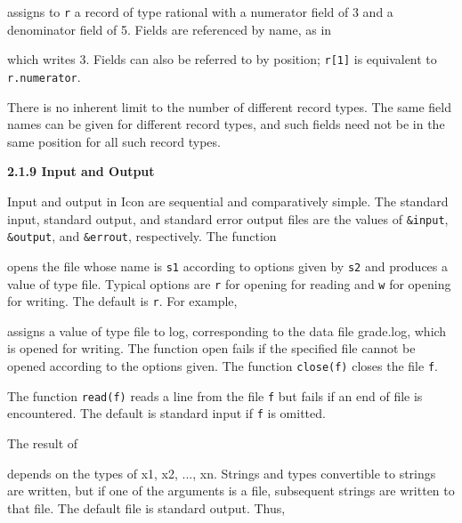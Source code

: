 \noindent
assigns to \texttt{r} a record of type rational with a
numerator field of 3 and a denominator field of 5. Fields are
referenced by name, as in



\noindent which writes 3. Fields can also be referred to by position;
\texttt{r[1]} is equivalent to \texttt{r.numerator}.

There is no inherent limit to the number of different record
types. The same field names can be given for different record types,
and such fields need not be in the same position for all such record
types.

{\sffamily\bfseries
2.1.9 Input and Output}

Input and output in Icon are sequential and comparatively simple. The
standard input, standard output, and standard error output files are
the values of \texttt{\&input}, \texttt{\&output}, and
\texttt{\&errout}, respectively. The function



\noindent opens the file whose name is \texttt{s1} according to
options given by \texttt{s2} and produces a value of type file.
Typical options are \texttt{{\textquotedbl}r{\textquotedbl}} for
opening for reading and \texttt{{\textquotedbl}w{\textquotedbl}} for
opening for writing. The default is
\texttt{{\textquotedbl}r{\textquotedbl}}. For example,



\noindent assigns a value of type file to log, corresponding to the
data file grade.log, which is opened for writing. The function open
fails if the specified file cannot be opened according to the options
given. The function \texttt{close(f)} closes the file \texttt{f}.

The function \texttt{read(f)} reads a line from the file \texttt{f}
but fails if an end of file is encountered. The default is standard
input if \texttt{f} is omitted.

The result of



\noindent depends on the types of x1, x2, ..., xn. Strings and types
convertible to strings are written, but if one of the arguments is a
file, subsequent strings are written to that file. The default file is
standard output. Thus,

